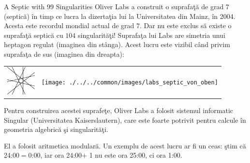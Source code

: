 \begin{surferPage}{A Septic with 99 Singularities}
     Oliver Labs a construit o suprafa\c{t}\u{a} de grad $7$ (septic\u{a}) \^{i}n timp ce lucra la
    dizerta\c{t}ia lui la Universitatea din Mainz, \^{i}n 2004. Acesta este recordul mondial actual
    de grad $7$. Dar nu este exclus s\u{a} existe o suprafa\c{t}\u{a} septic\u{a} cu $104$ singularit\u{a}\c{t}i!
    Suprafa\c{t}a lui Labs are simetria unui heptagon regulat (imaginea din st\^{a}nga).
    Acest lucru este vizibil c\^{a}nd privim suprafa\c{t}a de sus (imaginea din dreapta):

    \vspace*{-0.3em}
    \begin{center}
      \begin{tabular}{c@{\qquad}c}
        \includegraphics[height=1.5cm]{./../../common/images/labsseptic1.pdf}
        &
        \texttt{[image: ./../../common/images/labs\_septic\_von\_oben]}
      \end{tabular}
    \end{center}
    \vspace*{-0.3em}

    Pentru construirea acestei suprafe\c{t}e, Oliver Labs a folosit sistemul informatic 
    {\sc Singular} (Universitatea Kaiserslautern), care este foarte potrivit pentru
    calcule \^{i}n geometria algebric\u{a} \c{s}i singularit\u{a}\c{t}i.

    El a folosit aritmetica modular\u{a}. Un exemplu de acest lucru ar fi un ceas: \c{s}tim c\u{a} 24:00$=$0:00, 
    iar ora 24:00$+$ 1 nu este ora 25:00, ci ora 1:00.
\end{surferPage}

